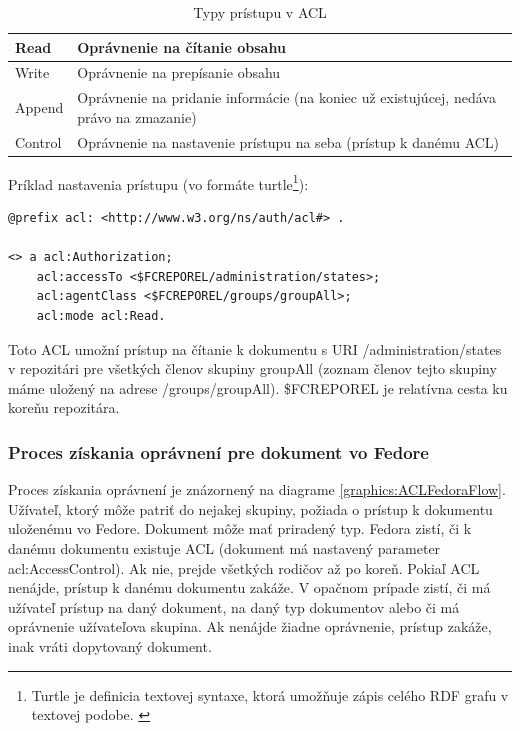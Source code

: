\documentclass[thesis=M,slovak]{FITthesis}[2013/05/06]
\begin{document}
\begin{table}[!htbp]\centering
 	\caption[Typy prístupu v ACL]{Typy prístupu v ACL}\label{tab:modeACL}
\begin{tabularx}{\textwidth}{|l|X|} \hline
Read	        & Oprávnenie na čítanie obsahu \\ \hline
Write 	& Oprávnenie na prepísanie obsahu \\ \hline
Append	& Oprávnenie na pridanie informácie (na koniec už existujúcej, nedáva právo na zmazanie)  \\ \hline
Control	& Oprávnenie na nastavenie prístupu na seba (prístup k danému ACL) \\ \hline
\end{tabularx}
\end{table} 

Príklad nastavenia prístupu (vo formáte turtle\footnote{Turtle je definicia textovej syntaxe, ktorá umožňuje zápis celého RDF grafu v textovej podobe. \cite{RDF}\nopagebreak}):
\begin{lstlisting}[frame=single] 
@prefix acl: <http://www.w3.org/ns/auth/acl#> .

<> a acl:Authorization;
    acl:accessTo <$FCREPOREL/administration/states>;
    acl:agentClass <$FCREPOREL/groups/groupAll>;
    acl:mode acl:Read.
\end{lstlisting}
Toto ACL umožní prístup na čítanie k dokumentu s URI /administration/states v repozitári pre všetkých členov skupiny groupAll (zoznam členov tejto skupiny máme uložený na adrese /groups/groupAll). \$FCREPOREL je relatívna cesta ku koreňu repozitára.

\subsubsection{Proces získania oprávnení pre dokument vo Fedore}
Proces získania oprávnení je znázornený na diagrame \ref{graphics:ACLFedoraFlow}. Užívateľ, ktorý môže patriť do nejakej skupiny, požiada o prístup k dokumentu uloženému vo Fedore. Dokument môže mať priradený typ. Fedora zistí, či k danému dokumentu existuje ACL (dokument má nastavený parameter acl:AccessControl). Ak nie, prejde všetkých rodičov až po koreň. Pokiaľ ACL nenájde, prístup k danému dokumentu zakáže.
V opačnom prípade zistí, či má užívateľ prístup na daný dokument, na daný typ dokumentov alebo či má oprávnenie užívateľova skupina. Ak nenájde žiadne oprávnenie, prístup zakáže, inak vráti dopytovaný dokument.
\end{document}
